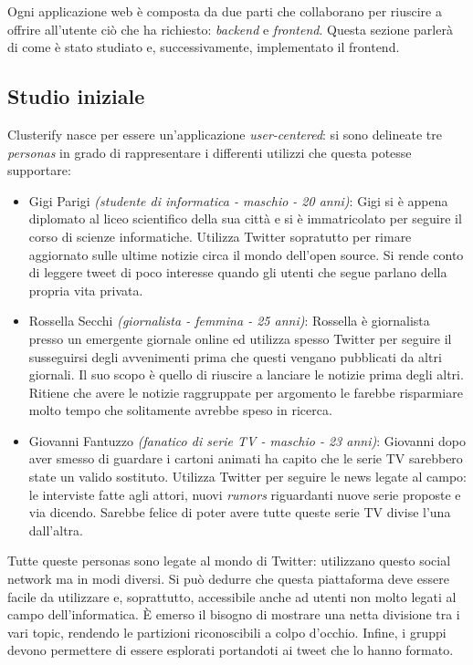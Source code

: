 Ogni applicazione web è composta da due parti che collaborano per riuscire a offrire all'utente ciò che ha richiesto: \emph{backend} e \emph{frontend}. Questa sezione parlerà di come è stato studiato e, successivamente, implementato il frontend.

\subsection{Studio iniziale}
	Clusterify nasce per essere un'applicazione \emph{user-centered}: si sono delineate tre \emph{personas} in grado di rappresentare i differenti utilizzi che questa potesse supportare:
	\begin{itemize}
		\item Gigi Parigi \emph{(studente di informatica - maschio - 20 anni)}: Gigi si è appena diplomato al liceo scientifico della sua città e si è immatricolato per seguire il corso di scienze informatiche. Utilizza Twitter sopratutto per rimare aggiornato sulle ultime notizie circa il mondo dell'open source. Si rende conto di leggere tweet di poco interesse quando gli utenti che segue parlano della propria vita privata.
		\item Rossella Secchi \emph{(giornalista - femmina - 25 anni)}: Rossella è giornalista presso un emergente giornale online ed utilizza spesso Twitter per seguire il susseguirsi degli avvenimenti prima che questi vengano pubblicati da altri giornali. Il suo scopo è quello di riuscire a lanciare le notizie prima degli altri. Ritiene che avere le notizie raggruppate per argomento le farebbe risparmiare molto tempo che solitamente avrebbe speso in ricerca.
		\item Giovanni Fantuzzo \emph{(fanatico di serie TV - maschio - 23 anni)}: Giovanni dopo aver smesso di guardare i cartoni animati ha capito che le serie TV sarebbero state un valido sostituto. Utilizza Twitter per seguire le news legate al campo: le interviste fatte agli attori, nuovi \emph{rumors} riguardanti nuove serie proposte e via dicendo. Sarebbe felice di poter avere tutte queste serie TV divise l'una dall'altra.
	\end{itemize}

	Tutte queste personas sono legate al mondo di Twitter: utilizzano questo social network ma in modi diversi. Si può dedurre che questa piattaforma deve essere facile da utilizzare e, soprattutto, accessibile anche ad utenti non molto legati al campo dell'informatica. È emerso il bisogno di mostrare una netta divisione tra i vari topic, rendendo le partizioni riconoscibili a colpo d'occhio. Infine, i gruppi devono permettere di essere esplorati portandoti ai tweet che lo hanno formato.

